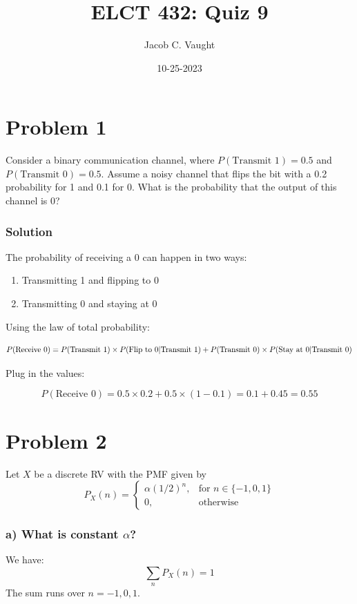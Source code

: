 \documentclass[12pt]{article}
\begin{document}
\title{ELCT 432: Quiz 9}
\author{Jacob C. Vaught}
\date{10-25-2023}
\maketitle

\section*{Problem 1}
Consider a binary communication channel, where \( P(\text{Transmit 1}) = 0.5 \) and \( P(\text{Transmit 0}) = 0.5 \). Assume a noisy channel that flips the bit with a 0.2 probability for 1 and 0.1 for 0. What is the probability that the output of this channel is 0?

\subsubsection*{Solution}

The probability of receiving a 0 can happen in two ways:
\begin{enumerate}
    \item Transmitting 1 and flipping to 0
    \item Transmitting 0 and staying at 0
\end{enumerate}

Using the law of total probability:

\[
P(\text{Receive 0}) = P(\text{Transmit 1}) \times P(\text{Flip to 0\textbar Transmit 1}) + P(\text{Transmit 0}) \times P(\text{Stay at 0\textbar Transmit 0})
\]

Plug in the values:

\[
P(\text{Receive 0}) = 0.5 \times 0.2 + 0.5 \times (1 - 0.1) = 0.1 + 0.45 = 0.55
\]
\newpage
\section*{Problem 2}
Let \( X \) be a discrete RV with the PMF given by
\[
P_X(n) =
\begin{cases} 
\alpha (1/2)^n, & \text{for } n \in \{-1, 0, 1\} \\
0, & \text{otherwise}
\end{cases}
\]

\subsubsection*{a) What is constant \(\alpha\)?}

We have:
\[
\sum_{n} P_X(n) = 1
\]
The sum runs over \( n = -1, 0, 1 \).
\end{document}
